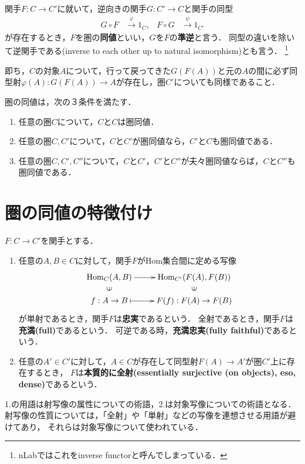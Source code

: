 \documentclass[uplatex, dvipdfmx]{jsreport}
\begin{document}
\begin{definition}
    関手$F:C\to C'$に就いて，逆向きの関手$G:C'\to C$と関手の同型
    \begin{align*}
        G\circ F&\xrightarrow{\varphi}1_C,&F\circ G&\xrightarrow{\psi}1_{C'}
    \end{align*}
    が存在するとき，$F$を圏の\textbf{同値}といい，$G$を$F$の\textbf{準逆}と言う．
    同型の違いを除いて逆関手である(inverse to each other up to natural isomorphism)とも言う．
    \footnote{nLabではこれをinverse functorと呼んでしまっている．}
\end{definition}
即ち，$C$の対象$A$について，行って戻ってきた$G(F(A))$と元の$A$の間に必ず同型射$\varphi (A):G(F(A))\to A$が存在し，圏$C'$についても同様であること．

\begin{proposition} \label{prop-welldefinedness equivalence of categories}
    圏の同値は，次の３条件を満たす．
    \begin{enumerate}
        \item 任意の圏$C$について，$C$と$C$は圏同値．
        \item 任意の圏$C,C'$について，$C$と$C'$が圏同値なら，$C'$と$C$も圏同値である．
        \item 任意の圏$C,C',C''$について，$C$と$C'$，$C'$と$C''$が夫々圏同値ならば，$C$と$C''$も圏同値である．
    \end{enumerate}
\end{proposition}

\section{圏の同値の特徴付け}

\begin{definition}
    $F:C\to C'$を関手とする．
    \begin{enumerate}
        \item 任意の$A,B\in C$に対して，関手$F$がHom集合間に定める写像
        \[\xymatrix@R-2pc{
            \Hom_C(A,B)\ar[r]&\Hom_{C'}(F(A),F(B))\\
            {\rotatebox{90}{$\in$}}&{\rotatebox{90}{$\in$}}\\
            f:A\to B\ar@{|->}[r]&F(f):F(A)\to F(B)
        }\]
        が単射であるとき，関手$F$は\textbf{忠実}であるという．
        全射であるとき，関手$F$は\textbf{充満(full)}であるという．
        可逆である時，\textbf{充満忠実(fully faithful)}であるという．
        \item 任意の$A'\in C'$に対して，$A\in C$が存在して同型射$F(A)\to A'$が圏$C'$上に存在するとき，
        $F$は\textbf{本質的に全射(essentially surjective (on objects), eso, dense)}であるという．
    \end{enumerate}
\end{definition}
\begin{remark}
    1.の用語は射写像の属性についての術語，2.は対象写像についての術語となる．
    射写像の性質については，「全射」や「単射」などの写像を連想させる用語が避けてあり，
    それらは対象写像について使われている．
\end{remark}
\end{document}
